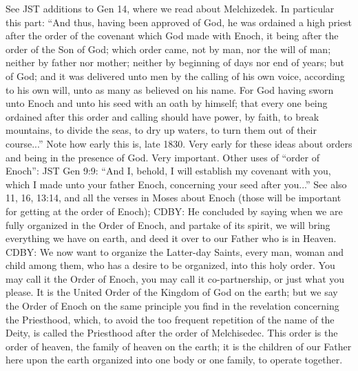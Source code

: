 \begin{compactdesc}
		\item[57$\vert$]
		\begin{compactdesc}
		\item[after the order of Enoch] %
			See JST additions to Gen 14, where we read about Melchizedek. In particular this part: ``And thus, having been approved of God, he was ordained a high priest after the order of the covenant which God made with Enoch, it being after the order of the Son of God; which order came, not by man, nor the will of man; neither by father nor mother; neither by beginning of days nor end of years; but of God; and it was delivered unto men by the calling of his own voice, according to his own will, unto as many as believed on his name. For God having sworn unto Enoch and unto his seed with an oath by himself; that every one being ordained after this order and calling should have power, by faith, to break mountains, to divide the seas, to dry up waters, to turn them out of their course...''
				Note how early this is, late 1830. Very early for these ideas about orders and being in the presence of God. Very important.
				Other uses of ``order of Enoch'':
					JST Gen 9:9: ``And I, behold, I will establish my covenant with you, which I made unto your father Enoch, concerning your seed after you...''
						See also 11, 16, 13:14, and all the verses in Moses about Enoch (those will be important for getting at the order of Enoch); 
					CDBY: He concluded by saying when we are fully organized in the Order of Enoch, and partake of its spirit, we will bring everything we have on earth, and deed it over to our Father who is in Heaven.
					CDBY: We now want to organize the Latter-day Saints, every man, woman and child among them, who has a desire to be organized, into this holy order. You may call it the Order of Enoch, you may call it co-partnership, or just what you please. It is the United Order of the Kingdom of God on the earth; but we say the Order of Enoch on the same principle you find in the revelation concerning the Priesthood, which, to avoid the too frequent repetition of the name of the Deity, is called the Priesthood after the order of Melchisedec. This order is the order of heaven, the family of heaven on the earth; it is the children of our Father here upon the earth organized into one body or one family, to operate together.
		\end{compactdesc}
		
		\end{compactdesc}

